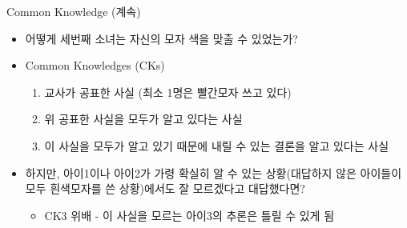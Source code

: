 \documentclass[final]{beamer}
\begin{document}
\begin{frame}[t]{Common Knowledge (계속)}
	\begin{itemize}
		\item 어떻게 세번째 소녀는 자신의 모자 색을 맞출 수 있었는가?
		\item Common Knowledges (CKs)
		\begin{enumerate}[CK1]
			\item 교사가 공표한 사실 (최소 1명은 빨간모자 쓰고 있다)
			\item 위 공표한 사실을 모두가 알고 있다는 사실
			\item 이 사실을 모두가 알고 있기 때문에 내릴 수 있는 결론을 알고 있다는 사실
		\end{enumerate}
		\item 하지만, 아이1이나 아이2가 가령 확실히 알 수 있는 상황(대답하지 않은 아이들이 모두 흰색모자를 쓴 상황)에서도 잘 모르겠다고 대답했다면? 
		\begin{itemize}
			\item CK3 위배 - 이 사실을 모르는 아이3의 추론은 틀릴 수 있게 됨
		\end{itemize}
	\end{itemize}
\end{frame}
\end{document}
